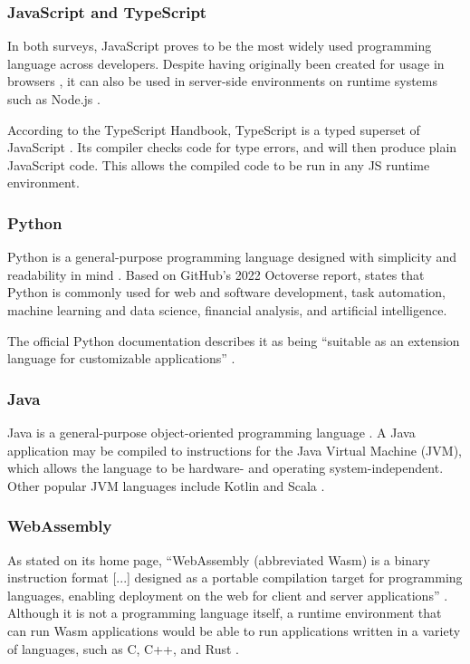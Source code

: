\subsubsection{JavaScript and TypeScript}
In both surveys, JavaScript proves to be the most widely used programming language across developers. Despite having originally been created for usage in browsers \autocite{NCC1995}, it can also be used in server-side environments on runtime systems such as Node.js \autocite{OpenJSFoundation}.

According to the TypeScript Handbook, TypeScript is a typed superset of JavaScript \autocite{TypeScript2023}. Its compiler checks code for type errors, and will then produce plain JavaScript code. This allows the compiled code to be run in any JS runtime environment.

\subsubsection{Python}
Python is a general-purpose programming language designed with simplicity and readability in mind \autocite{Peters2004}. Based on GitHub's 2022 Octoverse report, \textcite{Scarlett2023} states that Python is commonly used for web and software development, task automation, machine learning and data science, financial analysis, and artificial intelligence.

The official Python documentation describes it as being ``suitable as an extension language for customizable applications'' \autocite{PSF2023}.

\subsubsection{Java}
Java is a general-purpose object-oriented programming language \autocite{Lindholm2015}. A Java application may be compiled to instructions for the Java Virtual Machine (JVM), which allows the language to be hardware- and operating system-independent. Other popular JVM languages include Kotlin and Scala \autocite{StackOverflow2023, JetBrains2023}.

\subsubsection{WebAssembly}
As stated on its home page, ``WebAssembly (abbreviated Wasm) is a binary instruction format [...] designed as a portable compilation target for programming languages, enabling deployment on the web for client and server applications'' \autocite{WebAssembly}. Although it is not a programming language itself, a runtime environment that can run Wasm applications would be able to run applications written in a variety of languages, such as C, C++, and Rust \autocite{EmscriptenContributors2015, RWWG2023}.

